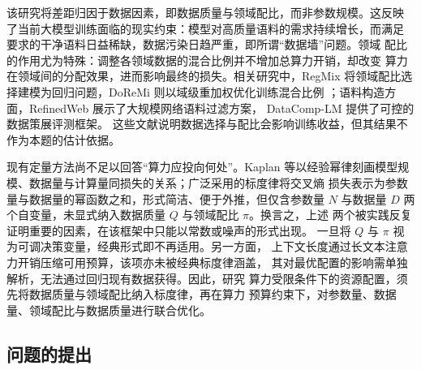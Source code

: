 \documentclass[bwprint]{gmcmthesis}
\numberwithin{equation}{section}
\numberwithin{figure}{section}
\numberwithin{table}{section}
\begin{document}
该研究将差距归因于数据因素，即数据质量与领域配比，而非参数规模。这反映
了当前大模型训练面临的现实约束：模型对高质量语料的需求持续增长，而满足
要求的干净语料日益稀缺，数据污染日趋严重，即所谓“数据墙”问题。领域
配比的作用尤为特殊：调整各领域数据的混合比例并不增加总算力开销，却改变
算力在领域间的分配效果，进而影响最终的损失\cite{xia_regmix_2024}。相关研究中，RegMix 将领域配比选择建模为回归问题，DoReMi 则以域级重加权优化训练混合比例
\cite{xie_doremi_2024}；语料构造方面，RefinedWeb 展示了大规模网络语料过滤方案，
DataComp-LM 提供了可控的数据策展评测框架\cite{penedo_refinedweb_2023,li_datacomp_lm_2024}。
这些文献说明数据选择与配比会影响训练收益，但其结果不作为本题的估计依据。

现有定量方法尚不足以回答“算力应投向何处”。Kaplan 等以经验幂律刻画模型规模、数据量与计算量同损失的关系\cite{kaplan_scaling_2020}；广泛采用的标度律将交叉熵
损失表示为参数量与数据量的幂函数之和，形式简洁、便于外推，但仅含参数量
$N$ 与数据量 $D$ 两个自变量，未显式纳入数据质量 $Q$ 与领域配比
$\pi$\cite{hoffmann_training_2022,bahri_explaining_2024}。换言之，上述
两个被实践反复证明重要的因素，在该框架中只能以常数或噪声的形式出现。
一旦将 $Q$ 与 $\pi$ 视为可调决策变量，经典形式即不再适用。另一方面，
上下文长度通过长文本注意力开销压缩可用预算，该项亦未被经典标度律涵盖，
其对最优配置的影响需单独解析，无法通过回归现有数据获得。因此，研究
算力受限条件下的资源配置，须先将数据质量与领域配比纳入标度律，再在算力
预算约束下，对参数量、数据量、领域配比与数据质量进行联合优化。

%
%

\subsection{问题的提出}
\end{document}
